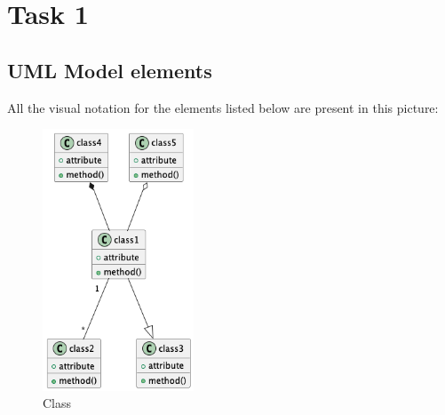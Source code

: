 \chapter{Task 1}
\section{UML Model elements}
All the visual notation for the elements listed below are present in this picture:
\begin{figure}[hbt]
\label{Class}
  \centering\includegraphics[width=0.4\textwidth]{Immagini/test-3.png}
  \caption{Class}
\end{figure}


